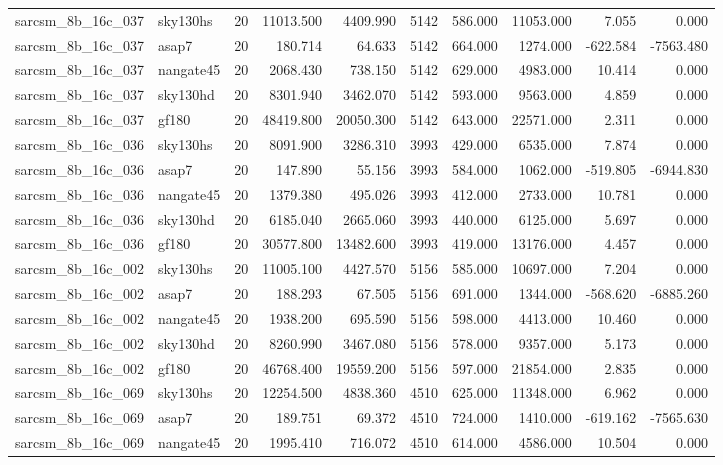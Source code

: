 \begin{tabular}{llrrrrrrrr}
sarcsm\_8b\_16c\_037 & sky130hs & 20 & 11013.500 & 4409.990 & 5142 & 586.000 & 11053.000 & 7.055 & 0.000 \\
sarcsm\_8b\_16c\_037 & asap7 & 20 & 180.714 & 64.633 & 5142 & 664.000 & 1274.000 & -622.584 & -7563.480 \\
sarcsm\_8b\_16c\_037 & nangate45 & 20 & 2068.430 & 738.150 & 5142 & 629.000 & 4983.000 & 10.414 & 0.000 \\
sarcsm\_8b\_16c\_037 & sky130hd & 20 & 8301.940 & 3462.070 & 5142 & 593.000 & 9563.000 & 4.859 & 0.000 \\
sarcsm\_8b\_16c\_037 & gf180 & 20 & 48419.800 & 20050.300 & 5142 & 643.000 & 22571.000 & 2.311 & 0.000 \\
sarcsm\_8b\_16c\_036 & sky130hs & 20 & 8091.900 & 3286.310 & 3993 & 429.000 & 6535.000 & 7.874 & 0.000 \\
sarcsm\_8b\_16c\_036 & asap7 & 20 & 147.890 & 55.156 & 3993 & 584.000 & 1062.000 & -519.805 & -6944.830 \\
sarcsm\_8b\_16c\_036 & nangate45 & 20 & 1379.380 & 495.026 & 3993 & 412.000 & 2733.000 & 10.781 & 0.000 \\
sarcsm\_8b\_16c\_036 & sky130hd & 20 & 6185.040 & 2665.060 & 3993 & 440.000 & 6125.000 & 5.697 & 0.000 \\
sarcsm\_8b\_16c\_036 & gf180 & 20 & 30577.800 & 13482.600 & 3993 & 419.000 & 13176.000 & 4.457 & 0.000 \\
sarcsm\_8b\_16c\_002 & sky130hs & 20 & 11005.100 & 4427.570 & 5156 & 585.000 & 10697.000 & 7.204 & 0.000 \\
sarcsm\_8b\_16c\_002 & asap7 & 20 & 188.293 & 67.505 & 5156 & 691.000 & 1344.000 & -568.620 & -6885.260 \\
sarcsm\_8b\_16c\_002 & nangate45 & 20 & 1938.200 & 695.590 & 5156 & 598.000 & 4413.000 & 10.460 & 0.000 \\
sarcsm\_8b\_16c\_002 & sky130hd & 20 & 8260.990 & 3467.080 & 5156 & 578.000 & 9357.000 & 5.173 & 0.000 \\
sarcsm\_8b\_16c\_002 & gf180 & 20 & 46768.400 & 19559.200 & 5156 & 597.000 & 21854.000 & 2.835 & 0.000 \\
sarcsm\_8b\_16c\_069 & sky130hs & 20 & 12254.500 & 4838.360 & 4510 & 625.000 & 11348.000 & 6.962 & 0.000 \\
sarcsm\_8b\_16c\_069 & asap7 & 20 & 189.751 & 69.372 & 4510 & 724.000 & 1410.000 & -619.162 & -7565.630 \\
sarcsm\_8b\_16c\_069 & nangate45 & 20 & 1995.410 & 716.072 & 4510 & 614.000 & 4586.000 & 10.504 & 0.000 \\

\end{tabular}
